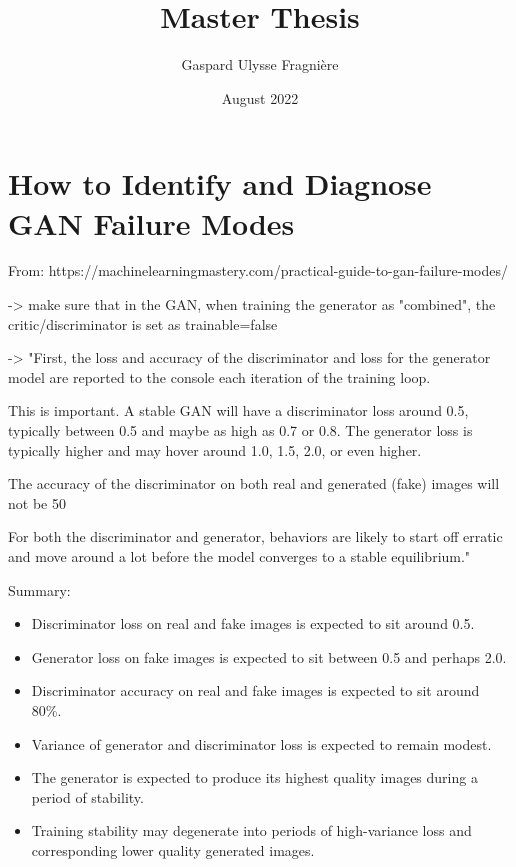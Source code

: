 \documentclass{article}
\title{Master Thesis}
\author{Gaspard Ulysse Fragnière}
\date{August 2022}
\begin{document}
\maketitle

\section{How to Identify and Diagnose GAN Failure Modes}

From: https://machinelearningmastery.com/practical-guide-to-gan-failure-modes/

-> make sure that in the GAN, when training the generator as "combined", the critic/discriminator is set as trainable=false

-> "First, the loss and accuracy of the discriminator and loss for the generator model are reported to the console each iteration of the training loop.

This is important. A stable GAN will have a discriminator loss around 0.5, typically between 0.5 and maybe as high as 0.7 or 0.8. The generator loss is typically higher and may hover around 1.0, 1.5, 2.0, or even higher.

The accuracy of the discriminator on both real and generated (fake) images will not be 50%

For both the discriminator and generator, behaviors are likely to start off erratic and move around a lot before the model converges to a stable equilibrium."

Summary:

\begin{itemize}
    \item Discriminator loss on real and fake images is expected to sit around 0.5.
    \item Generator loss on fake images is expected to sit between 0.5 and perhaps 2.0.
    \item Discriminator accuracy on real and fake images is expected to sit around 80\%.
    \item Variance of generator and discriminator loss is expected to remain modest.
    \item The generator is expected to produce its highest quality images during a period of stability.
    \item Training stability may degenerate into periods of high-variance loss and corresponding lower quality generated images.
\end{itemize}
\end{document}
